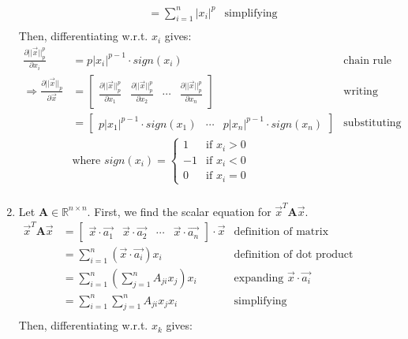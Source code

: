 \documentclass[11pt, fleqn]{article}
\newcommand{\pd}[2]{\frac{\partial #1}{\partial #2}}
\begin{document}
\begin{enumerate}
\begin{align*}
        &= \sum_{i=1}^{n} |x_i|^p & \text{simplifying} \\
    \end{align*}
    Then, differentiating w.r.t. $x_i$ gives:
    \begin{align*}
        \pd{||\vec{x}||_p^p}{x_i} &= p |x_i|^{p - 1} \cdot sign(x_i) & \text{chain rule} \\
        \Rightarrow \pd{||\vec{x}||_p}{\vec{x}} &= \begin{bmatrix}
            \pd{||\vec{x}||_p^p}{x_1} & \pd{||\vec{x}||_p^p}{x_2} & \cdots & \pd{||\vec{x}||_p^p}{x_n}
        \end{bmatrix} & \text{writing derivative in vector form} \\
        &= \begin{bmatrix}
            p |x_1|^{p - 1} \cdot sign(x_1) & \cdots & p |x_n|^{p - 1} \cdot sign(x_n)
        \end{bmatrix} & \text{substituting previous result} \\
        &\text{where } sign(x_i) = \begin{cases}
            1 & \text{if } x_i > 0 \\
            -1 & \text{if } x_i < 0 \\
            0 & \text{if } x_i = 0
        \end{cases} \\
    \end{align*}
    \item Let $\textbf{A} \in \mathbb{R}^{n \times n}$. First, we find the scalar equation for $\vec{x}^T \textbf{A} \vec{x}$.
    \begin{align*}
        \vec{x}^T \textbf{A} \vec{x} &= \begin{bmatrix}
            \vec{x} \cdot \vec{a_1} & \vec{x} \cdot \vec{a_2} & \cdots & \vec{x} \cdot \vec{a_n}
        \end{bmatrix} \cdot \vec{x} & \text{definition of matrix multiplication} \\
        &= \sum_{i=1}^{n} (\vec{x} \cdot \vec{a_i}) x_i & \text{definition of dot product} \\
        &= \sum_{i=1}^{n} \left( \sum_{j=1}^{n} A_{ji} x_j \right) x_i & \text{expanding } \vec{x} \cdot \vec{a_i} \\
        &= \sum_{i=1}^{n} \sum_{j=1}^{n} A_{ji} x_j x_i & \text{simplifying} \\
    \end{align*}
    Then, differentiating w.r.t. $x_k$ gives:
    \begin{align*}

\end{align*}
\end{enumerate}
\end{document}
